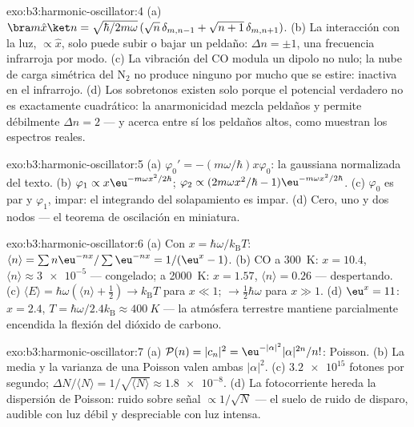 \begin{solution}{exo:b3:harmonic-oscillator:4}
(a) $\bra m\hat x\ket n = \sqrt{\hbar/2m\omega}\,(\sqrt n\,
\delta_{m,n-1} + \sqrt{n + 1}\,\delta_{m,n+1})$. (b) La interacción
con la luz, $\propto\hat x$, solo puede subir o bajar un peldaño: $\Delta n =
\pm1$, una frecuencia infrarroja por modo. (c) La vibración del CO modula un
dipolo no nulo; la nube de carga simétrica del N$_2$ no produce ninguno por
mucho que se estire: inactiva en el infrarrojo. (d) Los sobretonos existen
solo porque el potencial verdadero no es exactamente cuadrático: la
anarmonicidad mezcla peldaños y permite débilmente $\Delta n = 2$ --- y
acerca entre sí los peldaños altos, como muestran los espectros reales.
\end{solution}

\begin{solution}{exo:b3:harmonic-oscillator:5}
(a) $\varphi_0' = -(m\omega/\hbar)x\varphi_0$: la gaussiana normalizada del
texto. (b) $\varphi_1 \propto x\eu^{-m\omega
x^2/2\hbar}$; $\varphi_2 \propto (2m\omega x^2/\hbar -
1)\eu^{-m\omega x^2/2\hbar}$. (c) $\varphi_0$ es par y $\varphi_1$, impar:
el integrando del solapamiento es impar. (d) Cero, uno y dos nodos --- el
teorema de oscilación en miniatura.
\end{solution}

\begin{solution}{exo:b3:harmonic-oscillator:6}
(a) Con $x = \hbar\omega/k_{\text{B}}T$: $\langle n\rangle =
\sum n\eu^{-nx}/\sum\eu^{-nx} = 1/(\eu^x - 1)$. (b) CO a
\qty{300}{K}: $x = 10.4$, $\langle n\rangle \approx \num{3e-5}$ ---
congelado; a \qty{2000}{K}: $x = 1.57$, $\langle n\rangle = 0.26$ ---
despertando. (c) $\langle E\rangle = \hbar\omega(\langle n\rangle +
\tfrac12) \to k_{\text{B}}T$ para $x \ll 1$; $\to \tfrac12\hbar
\omega$ para $x \gg 1$. (d) $\eu^x = 11$: $x = 2.4$, $T =
\hbar\omega/2.4k_{\text{B}} \approx \qty{400}{K}$ --- la atmósfera terrestre
mantiene parcialmente encendida la flexión del dióxido de carbono.
\end{solution}

\begin{solution}{exo:b3:harmonic-oscillator:7}
(a) $\mathcal P(n) = |c_n|^2 = \eu^{-|\alpha|^2}|\alpha|^{2n}/n!$:
Poisson. (b) La media y la varianza de una Poisson valen ambas $|\alpha|^2$.
(c) $\num{3.2e15}$ fotones por segundo; $\Delta N/\langle N\rangle =
1/\sqrt{\langle N\rangle} \approx \num{1.8e-8}$. (d) La
fotocorriente hereda la dispersión de Poisson: ruido sobre señal
$\propto 1/\sqrt N$ --- el suelo de ruido de disparo, audible con luz débil
y despreciable con luz intensa.
\end{solution}

